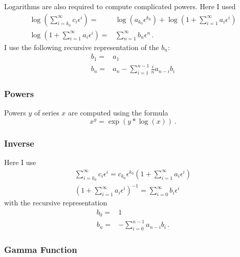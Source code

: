\documentclass{article}
\begin{document}
Logarithms are also required to compute complicated powers. Here I used
\begin{align}
  \label{eq:log}
\log\left(\sum_{i=k_0}^{\infty}c_i \epsilon^i\right)=&\log\left(a_{k_0}\epsilon^{k_0}\right)+\log\left(1+\sum_{i=1}^{\infty}a_i \epsilon^i\right)\\
\log\left(1+\sum_{i=1}^{\infty}a_i \epsilon^i\right)=&\sum_{n=1}^\infty
b_n\epsilon^n\,.
\end{align}
I use the following recursive representation of the $b_n$:
\begin{align}
  \label{eq:log_rec}
b_1=&a_1\\
b_n =& a_n - \sum_{i=1}^{n-1} \frac{i}{n} a_{n-i}b_{i}
\end{align}

\subsubsection{Powers}
\label{sec:impl_pow}

Powers $y$ of series $x$ are computed using the formula
\begin{equation}
  \label{eq:pow}
  x^y=\exp(y*\log(x))\,.
\end{equation}


\subsubsection{Inverse}
\label{sec:impl_inverse}

Here I use
\begin{align}
  \label{eq:inv}
  \sum_{i=k_0}^{\infty}c_i
    \epsilon^i=c_{k_0}\epsilon^{k_0}\left(1+\sum_{i=1}^{\infty}a_i
    \epsilon^i\right)\\
\left(1+\sum_{i=1}^{\infty}a_i \epsilon^i\right)^{-1}=\sum_{i=0}^{\infty}b_i \epsilon^i
\end{align}
with the recursive representation
\begin{align}
  \label{eq:inv_rec}
  b_0=&1\\
  b_n=&-\sum_{i=0}^{n-1} a_{n-i}b_i \,.
\end{align}

\subsubsection{Gamma Function}
\label{sec:impl_gamma}
\end{document}
